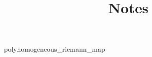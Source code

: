 \documentclass{article}
\title{Notes}
\begin{document}



{polyhomogeneous_riemann_map}


%
\end{document}
